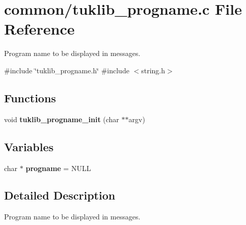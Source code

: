 \section{common/tuklib\+\_\+progname.c File Reference}
\label{tuklib__progname_8c}


Program name to be displayed in messages.  


{\ttfamily \#include \char`\"{}tuklib\+\_\+progname.\+h\char`\"{}}\newline
{\ttfamily \#include $<$string.\+h$>$}\newline
\subsection*{Functions}
\begin{DoxyCompactItemize}
\item 
\mbox{\label{tuklib__progname_8c_a2d6344889dbe31cea9e5574f671e55dc}} 
void {\bfseries tuklib\+\_\+progname\+\_\+init} (char $\ast$$\ast$argv)
\end{DoxyCompactItemize}
\subsection*{Variables}
\begin{DoxyCompactItemize}
\item 
\mbox{\label{tuklib__progname_8c_ab9e1449fd00c98428516f0b41eddcb10}} 
char $\ast$ {\bfseries progname} = N\+U\+LL
\end{DoxyCompactItemize}


\subsection{Detailed Description}
Program name to be displayed in messages. 

